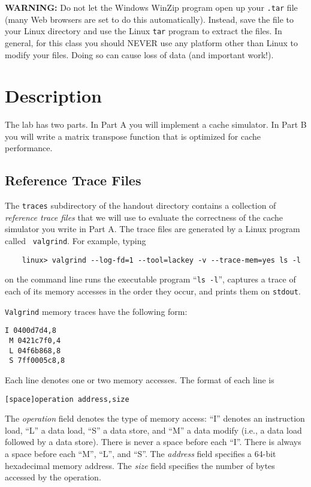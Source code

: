 \documentclass[11pt]{article}
\begin{document}
\textbf{WARNING:} Do not let the Windows WinZip program open up your
       {\tt .tar} file (many Web browsers are set to do this
       automatically).  Instead, save the file to your Linux directory
       and use the Linux {\tt tar} program to extract the files.  In
       general, for this class you should NEVER use any platform other
       than Linux to modify your files. Doing so can cause loss of
       data (and important work!).

\section{Description}
The lab has two parts. In Part A you will implement a cache
simulator. In Part B you will write a matrix transpose function that
is optimized for cache performance.

\subsection{Reference Trace Files}

The {\tt traces} subdirectory of the handout directory contains a
collection of {\em reference trace files} that we will use to evaluate the correctness
of the cache simulator you write in Part A. 
The trace files are generated by a Linux program called {\tt
  valgrind}.  For example, typing
\begin{verbatim}
    linux> valgrind --log-fd=1 --tool=lackey -v --trace-mem=yes ls -l
\end{verbatim}
on the command line runs the executable program ``{\tt ls -l}'',
captures a trace of each of its memory accesses in the order they
occur, and prints them on \texttt{stdout}.  

{\tt Valgrind} memory traces have the following form:
\begin{verbatim}
I 0400d7d4,8
 M 0421c7f0,4
 L 04f6b868,8
 S 7ff0005c8,8
\end{verbatim}
Each line denotes one or two memory accesses. The format of each line is 
\begin{verbatim}
[space]operation address,size
\end{verbatim}
The {\em operation} field denotes the type of memory access: ``I''
  denotes an instruction load, ``L'' a data load, ``S''
  a data store, and ``M'' a data modify (i.e., a data load
  followed by a data store).  There is never a space before each ``I''.
  There is always a space before each ``M'', ``L'', and ``S''.
The {\em address} field specifies a 64-bit hexadecimal memory address. 
The {\em size} field specifies the number of bytes accessed by the
operation.
\end{document}
